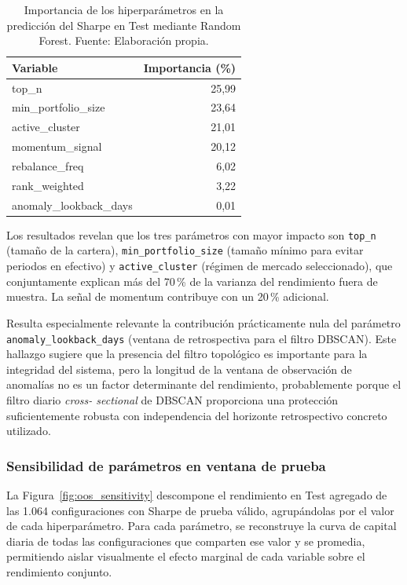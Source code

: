 \begin{table}[H]
\centering
\begin{tabular}{lr}
\toprule
\textbf{Variable} & \textbf{Importancia (\%)} \\
\midrule
top\_n                   & 25,99 \\
min\_portfolio\_size     & 23,64 \\
active\_cluster          & 21,01 \\
momentum\_signal         & 20,12 \\
rebalance\_freq          & 6,02  \\
rank\_weighted           & 3,22  \\
anomaly\_lookback\_days  & 0,01  \\
\bottomrule
\end{tabular}
\caption{Importancia de los hiperparámetros en la predicción del
Sharpe en Test mediante Random Forest. Fuente: Elaboración propia.}
\label{tab:feature_importance}
\end{table}

Los resultados revelan que los tres parámetros con mayor impacto
son \texttt{top\_n} (tamaño de la cartera), \texttt{min\_portfolio\_size}
(tamaño mínimo para evitar periodos en efectivo) y
\texttt{active\_cluster} (régimen de mercado seleccionado), que
conjuntamente explican más del 70\,\% de la varianza del
rendimiento fuera de muestra. La señal de momentum contribuye
con un 20\,\% adicional.

Resulta especialmente relevante la contribución prácticamente
nula del parámetro \texttt{anomaly\_lookback\_days} (ventana de
retrospectiva para el filtro DBSCAN). Este hallazgo sugiere que
la presencia del filtro topológico es importante para la
integridad del sistema, pero la longitud de la ventana de
observación de anomalías no es un factor determinante del
rendimiento, probablemente porque el filtro diario \textit{cross-
sectional} de DBSCAN proporciona una protección suficientemente
robusta con independencia del horizonte retrospectivo concreto
utilizado.

\subsubsection{Sensibilidad de parámetros en ventana de prueba}

La Figura~\ref{fig:oos_sensitivity} descompone el rendimiento en Test agregado de las 1.064 configuraciones con Sharpe
de prueba válido, agrupándolas por el valor de cada
hiperparámetro. Para cada parámetro, se reconstruye la curva de
capital diaria de todas las configuraciones que comparten ese
valor y se promedia, permitiendo aislar visualmente el efecto
marginal de cada variable sobre el rendimiento conjunto.

